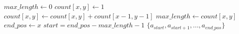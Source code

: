 \begin{algorithmic}[1]
\State $max\_length \gets 0$
    \State $count[x, y] \gets 1$
      \State $count[x, y] \gets count[x, y] + count [x-1, y-1]$
    \EndIf
      \State $max\_length \gets count[x, y]$
      \State $end\_pos \gets x$
    \EndIf
    \State $start = end\_pos - max\_length - 1$
    \State \Return $\{a_{start}, a_{start+1}, ... , a_{end\_pos}\}$
  \EndFor
\EndFor
\EndFunction
\end{algorithmic}

